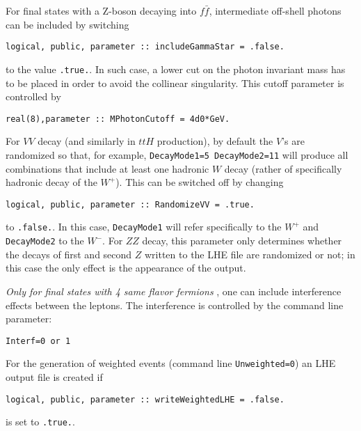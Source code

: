 \documentclass[aps,superscriptaddress,nofootinbib]{revtex4}
\begin{document}
\noindent
For final states with a Z-boson decaying into $f\bar f$, intermediate off-shell photons can be included by switching
\begin{verbatim}
logical, public, parameter :: includeGammaStar = .false.
\end{verbatim}
to the value \verb|.true.|. In such case, a lower cut on the photon invariant mass has to be placed in order to avoid the
collinear singularity. This cutoff parameter is controlled by
\begin{verbatim}
real(8),parameter :: MPhotonCutoff = 4d0*GeV.
\end{verbatim}

\noindent
For $VV$ decay (and similarly in $ttH$ production), by default the $V$'s are randomized so that, for example, \verb|DecayMode1=5 DecayMode2=11| will produce all combinations that include at least one hadronic $W$ decay (rather of specifically hadronic decay of the $W^+$).  This can be switched off by changing
\begin{verbatim}
logical, public, parameter :: RandomizeVV = .true.
\end{verbatim}
to \verb|.false.|.  In this case, \verb|DecayMode1| will refer specifically to the $W^+$ and \verb|DecayMode2| to the $W^-$.  For $ZZ$ decay, this parameter only determines whether the decays of first and second $Z$ written to the LHE file are randomized or not; in this case the only effect is the appearance of the output.

\noindent
{\it Only for final states with 4 same flavor fermions }, one can include interference effects between the leptons.  The interference is controlled by the command line parameter:
\begin{verbatim}
Interf=0 or 1
\end{verbatim}

\noindent
For the generation of weighted events (command line \verb|Unweighted=0|) an LHE output file is created if
\begin{verbatim}
logical, public, parameter :: writeWeightedLHE = .false.
\end{verbatim}
is set to \verb|.true.|.
\end{document}
